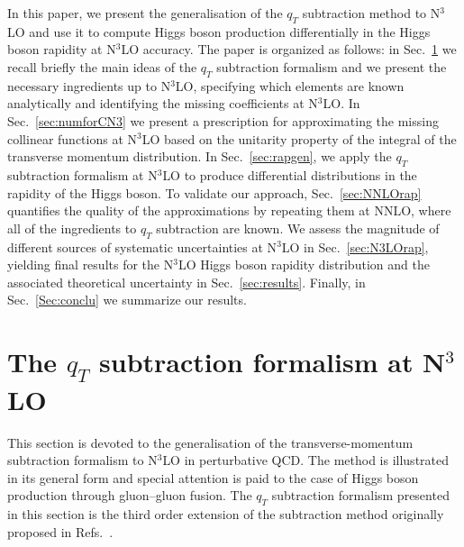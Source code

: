 \documentclass[12pt]{article}
\DeclareRobustCommand{\qt}{q_T}
\begin{document}
In this paper, we present the generalisation of the $\qt$ subtraction method to N$^{3}$LO and use it to compute Higgs boson production differentially in the Higgs boson rapidity at N$^{3}$LO accuracy. The paper is organized as follows: in Sec.~\ref{sec:forma} we recall briefly the main ideas of the $\qt$ subtraction formalism and we present the necessary ingredients up to  N$^{3}$LO, specifying which elements are known analytically and identifying the missing coefficients at N$^{3}$LO. In Sec.~\ref{sec:numforCN3} we present a prescription for approximating the missing collinear functions at N$^{3}$LO based on the unitarity property of the integral of the transverse momentum distribution. In Sec.~\ref{sec:rapgen}, we apply the $\qt$ subtraction formalism at N$^{3}$LO to produce differential distributions in the rapidity of the Higgs boson. To validate our approach, Sec.~\ref{sec:NNLOrap} quantifies the quality of the approximations by repeating them at NNLO, where all of the ingredients to $\qt$ subtraction are known. We assess the magnitude of different sources of systematic uncertainties at  N$^{3}$LO in Sec.~\ref{sec:N3LOrap}, yielding final results for the N$^{3}$LO Higgs boson rapidity distribution and the associated theoretical uncertainty in Sec.~\ref{sec:results}. Finally, in Sec.~\ref{Sec:conclu} we summarize our results.




\section{The $\qt$ subtraction formalism at N$^{3}$LO}
\label{sec:forma}
This section is devoted to the generalisation of the transverse-momentum subtraction formalism to N$^{3}$LO in perturbative QCD. The method is illustrated in its general form and special attention is paid to the case of Higgs boson production through gluon--gluon fusion. The $\qt$ subtraction formalism presented in this section is the third order extension of the subtraction method originally proposed in Refs.~\cite{Catani:2007vq,Bozzi:2005wk,Bonciani:2015sha}.
\end{document}
